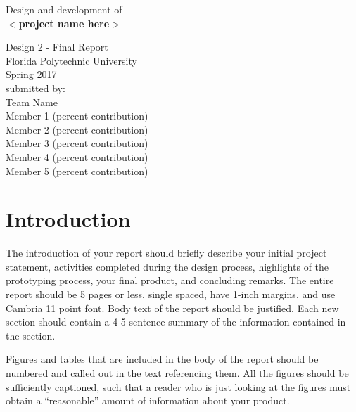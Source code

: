 \documentclass[12pt]{article}
\begin{document}
\begin{center}
\large
{}
\vspace*{\fill}
Design and development of \\
\textbf{$<$project name here$>$}

\vspace{2cm}

Design 2 - Final Report \\
Florida Polytechnic University \\
Spring 2017\\

\vspace{2cm}
submitted by:\\
Team Name\\
Member 1 (percent contribution)\\
Member 2 (percent contribution)\\
Member 3 (percent contribution)\\
Member 4 (percent contribution)\\
Member 5 (percent contribution)\\
\vspace*{\fill}

\end{center}




\newpage

\tableofcontents



\newpage

\section{Introduction}

The introduction of your report should  briefly describe your initial project statement, activities completed during the design process, highlights of the prototyping process, your final product, and concluding remarks.  The entire report should be 5 pages or less, single spaced, have 1-inch margins, and use Cambria 11 point font.  Body text of the report should be justified.   Each new section should contain a 4-5 sentence summary of the information contained in the section. 

 Figures and tables that are included in the body of the report should be numbered and called out in the text referencing them.  All the figures should be sufficiently captioned, such that a reader who is just looking at the figures must obtain a ``reasonable'' amount of information about your product. 
\end{document}
